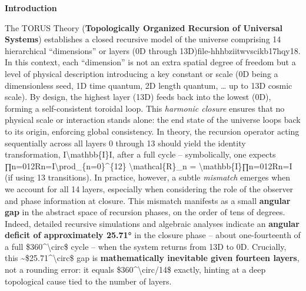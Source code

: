 \documentclass[]{article}
\begin{document}
\textbf{Introduction}

The TORUS Theory (\textbf{Topologically Organized Recursion of Universal
Systems}) establishes a closed recursive model of the universe
comprising 14 hierarchical ``dimensions'' or layers (0D through
13D)​file-hhhbziitwvscikb17hqy18. In this context, each ``dimension'' is
not an extra spatial degree of freedom but a level of physical
description introducing a key constant or scale (0D being a
dimensionless seed, 1D time quantum, 2D length quantum, \ldots{} up to
13D cosmic scale)​. By design, the highest layer (13D) feeds back into
the lowest (0D), forming a self-consistent toroidal loop​. This
\emph{harmonic closure} ensures that no physical scale or interaction
stands alone: the end state of the universe loops back to its origin,
enforcing global consistency. In theory, the recursion operator acting
sequentially across all layers 0 through 13 should yield the identity
transformation, I\textbackslash{}mathbb\{I\}I, after a full cycle --
symbolically, one expects
∏n=012Rn=I\textbackslash{}prod\_\{n=0\}\^{}\{12\}
\textbackslash{}mathcal\{R\}\_n =
\textbackslash{}mathbb\{I\}∏n=012​Rn​=I (if using 13 transitions). In
practice, however, a subtle \emph{mismatch} emerges when we account for
all 14 layers, especially when considering the role of the observer and
phase information at closure. This mismatch manifests as a small
\textbf{angular gap} in the abstract space of recursion phases, on the
order of tens of degrees. Indeed, detailed recursive simulations and
algebraic analyses indicate an \textbf{angular deficit of approximately
25.71°} in the closure phase -- about one-fourteenth of a full
\$360\^{}\textbackslash{}circ\$ cycle -- when the system returns from
13D to 0D. Crucially, this
\textasciitilde{}\$25.71\^{}\textbackslash{}circ\$ gap is
\textbf{mathematically inevitable given fourteen layers}, not a rounding
error: it equals \$360\^{}\textbackslash{}circ/14\$ exactly, hinting at
a deep topological cause tied to the number of layers.
\end{document}
